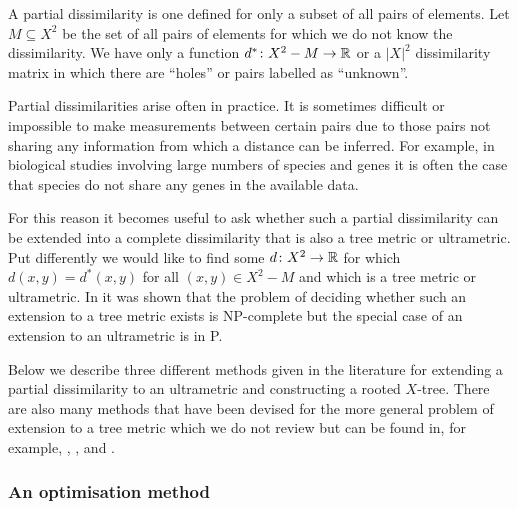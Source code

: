 A partial dissimilarity is one defined for only a subset of all pairs of
elements.  Let $M \subseteq X^2$ be the set of all pairs of elements for which
we do not know the dissimilarity.  We have only a function $d^* \colon X^2 - M
\to {\mathbb R}$ or a $|X|^2$ dissimilarity matrix in which there are ``holes'' or
pairs labelled as ``unknown''.

Partial dissimilarities arise often in practice.  It is sometimes difficult or
impossible to make measurements between certain pairs due to those pairs not
sharing any information from which a distance can be inferred.  For example,
in biological studies involving large numbers of species and genes it is often
the case that species do not share any genes in the available
data\cite{criscuolo2008fastnj}.

For this reason it becomes useful to ask whether such a partial dissimilarity
can be extended into a complete dissimilarity that is also a tree metric or
ultrametric.  Put differently we would like to find some $d \colon X^2 \to
{\mathbb R}$ for which $d(x,y) = d^*(x,y)$ for all $(x,y) \in X^2 - M$ and which is a
tree metric or ultrametric.  In \citep{farach1995robust} it was shown that the
problem of deciding whether such an extension to a tree metric exists is
NP-complete but the special case of an extension to an ultrametric is in P.

Below we describe three different methods given in the literature for
extending a partial dissimilarity to an ultrametric and constructing a rooted
$X$-tree.  There are also many methods that have been devised for the more
general problem of extension to a tree metric which we do not review but can
be found in, for example, \citep{guenoche1999approximations},
\citep{farach1995robust}, \citep{makarenkov2001nouvelle} and
\citep{guenoche2004extension}.

\subsubsection{An optimisation method}
\label{sec:part-dist-optim-method}

